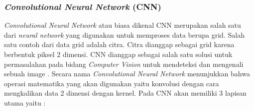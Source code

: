 \subsubsection{\textit{Convolutional Neural Network} (CNN)}
\textit{Convolutional Neural Network} atau biasa dikenal CNN merupakan salah satu dari \textit{neural network} yang digunakan untuk memproses data berupa grid. Salah satu contoh dari data grid adalah citra. Citra dianggap sebagai grid karena berbentuk piksel 2 dimensi. CNN dianggap sebagai salah satu solusi untuk permasalahan pada bidang \textit{Computer Vision} untuk mendeteksi dan mengenali sebuah image \parencite{CNN}. Secara nama \textit{Convolutional Neural Network} menunjukkan bahwa operasi matematika yang akan digunakan yaitu konvolusi dengan cara mengkalikan data 2 dimensi dengan kernel. Pada CNN akan memiliki 3 lapisan utama yaitu :
